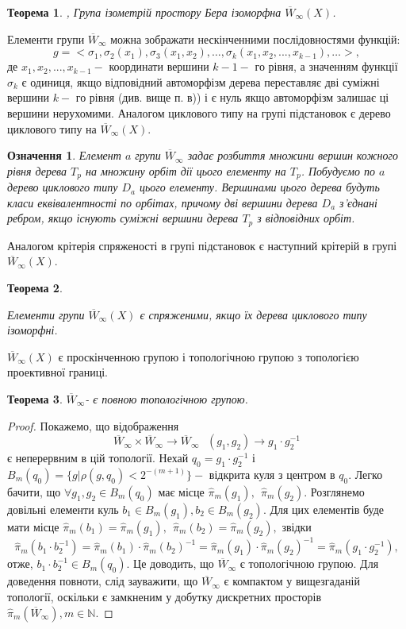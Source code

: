 \documentclass[a4paper,12pt]{article} \usepackage{a4wide}
\numberwithin{equation}{subsection}
\newtheorem{theorem}{Теорема}[subsection]
\newtheorem{definition}{Означення}[subsection]
\begin{document}
  \begin{theorem}
  \cite{Sch1},\cite{Sch2}
   Група ізометрій простору Бера ізоморфна $ \overline{W}_\infty (X)$.
\end{theorem}
Елементи групи $\overline{W}_\infty $ можна  зображати
  нескінченними  послідовностями функцій:
\begin{equation} \label{sigmaseq}
   g=<\sigma_1,\sigma_2(x_1),\sigma_3(x_1,x_2), \ldots ,\sigma_k(x_1,x_2,...,x_{k-1}), \ldots >,
\end{equation}
   де $x_1,x_2,...,x_{k-1} -$ координати вершини $k-1-$ го рівня, а значенням функції $\sigma_k$ є одиниця,
   якщо відповідний автоморфізм дерева переставляє дві суміжні вершини $k-$ го рівня (див. вище п. в)) і є нуль
   якщо автоморфізм залишає ці вершини нерухомими.
   Аналогом циклового типу на групі підстановок є дерево циклового типу на $ \overline{W}_\infty (X)$.
   \begin{definition}
Елемент $a$ групи $\overline{W}_\infty $ задає розбиття множини вершин кожного рівня дерева $T_p$
 на множину орбіт дії цього елементу на $T_p$. Побудуємо по $a$ дерево циклового типу $D_a$ цього елементу. Вершинами цього дерева будуть
 класи еквівалентності по орбітах, причому дві вершини дерева $D_a$ з'єднані ребром, якщо існують суміжні вершини дерева $T_p$ з відповідних орбіт.
    \end{definition}
    Аналогом крітерія спряженості в групі підстановок є наступний крітерій в групі $ \overline{W}_\infty (X)$.
   \begin{theorem} \cite{Sch2}

 Елементи групи $ \overline{W}_\infty (X)$ є спряженими, якщо їх дерева циклового типу ізоморфні.
\end{theorem}
$ \overline{W}_\infty (X)$ є проскінченною групою і топологічною групою з топологією проективної границі.
\begin{theorem} \label{topgroup}
    $\overline{W}_\infty $- є повною топологічною групою.
\end{theorem}
\begin{proof}
     Покажемо, що  відображення
      \[ \overline{W}_\infty \times \overline{W}_\infty \rightarrow
      \overline{W}_\infty  \ \ \ (g_1,g_2)\rightarrow g_1\cdot g_2^{-1} \] є
    неперервним в цій топології.
Нехай $q_0 = g_1 \cdot g_2^{-1}$ і $B_{m}(q_0) = \{g | \rho(g,q_0) < 2^{- (m+1)} \}-$ відкрита куля з центром в $q_0.$
Легко бачити, що $\forall g_1,g_2 \in B_{m}(q_0)$ має місце $\hat{\pi}_m(g_1), \ \ \hat{\pi}_m(g_2).$ Розглянемо
довільні елементи куль $b_1  \in B_{m}(g_1), b_2 \in B_{m}(g_2).$ Для цих елементів буде мати місце $\hat{\pi}_m(b_1) =
\hat{\pi}_m(g_1), \ \ \hat{\pi}_m(b_2) = \hat{\pi}_m(g_2),$ звідки
\[ \hat{\pi}_m ( b_1 \cdot b_2^{-1}) = \hat{\pi}_m ( b_1) \cdot \hat{\pi}_m ( b_2)^{-1} =
\hat{\pi}_m ( g_1) \cdot \hat{\pi}_m ( g_2)^{-1} = \hat{\pi}_m ( g_1 \cdot  g_2^{-1}),\] отже, $b_1 \cdot b_2^{-1} \in
B_{m} (q_0).$ Це   доводить, що  $\overline{W}_\infty $ є топологічною групою. Для доведення повноти, слід зауважити,
що $\overline{W}_\infty $ є компактом у вищезгаданій топології, оскільки є замкненим у добутку дискретних просторів
$\hat{\pi}_m(\overline{W}_\infty ),m \in \mathbb{N}  $.
\end{proof}
\end{document}
